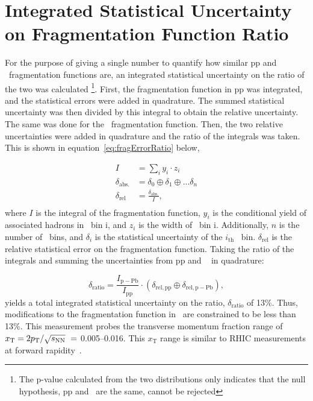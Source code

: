 \section{Integrated Statistical Uncertainty on Fragmentation Function Ratio}
For the purpose of giving a single number to quantify how similar pp and \pPb~fragmentation functions are, an integrated statistical uncertainty on the ratio of the two was calculated \footnote{The p-value calculated from the two distributions only indicates that the null hypothesis, pp and \pPb~are the same, cannot be rejected}. First, the fragmentation function in pp was integrated, and the statistical errors were added in quadrature. The summed statistical uncertainty was then divided by this integral to obtain the relative uncertainty. The same was done for the \pPb~fragmentation function. Then, the two relative uncertainties were added in quadrature and the ratio of the integrals was taken. This is shown in equation~\ref{eq:fragErrorRatio} below,

\begin{equation}\label{eq:fragErrorRatio}
  \begin{split}
    I &= \sum_i y_i\cdot z_i \\
    \delta_\mathrm{abs.} &= \delta_0 \oplus \delta_1 \oplus ...\delta_n\\
    \delta_\mathrm{rel} &= \frac{\delta_\mathrm{abs.}}{I},\\
  \end{split}
\end{equation}
where $I$ is the integral of the fragmentation function, $y_i$ is the conditional yield of associated hadrons in \zt~bin i, and $z_i$ is the width of \zt~bin i. Additionally, $n$ is the number of \zt~bins, and $\delta_i$ is the statistical uncertainty of the $i_\mathrm{th}$ \zt~bin. $\delta_\mathrm{rel}$ is the relative statistical error on the fragmentation function. Taking the ratio of the integrals and summing the uncertainties from pp and \pPb~ in quadrature:

\begin{equation}
  \delta_\mathrm{ratio} = \frac{I_\mathrm{p-Pb}}{I_\mathrm{pp}}\cdot (\delta_\mathrm{rel,pp} \oplus \delta_\mathrm{rel,p-Pb}),
\end{equation}
yields a total integrated statistical uncertainty on the ratio, $\delta_\mathrm{ratio}$ of 13\%. Thus, modifications to the fragmentation function in \pPb~are constrained to be less than 13\%. This measurement probes the transverse momentum fraction range of {$x_{\mathrm{T}} = 2\pt/\sqrt{s_{\mathrm{NN}}}\ = $ 0.005--0.016}. This $x_{\mathrm{T}}$ range is similar to RHIC measurements at forward rapidity~\cite{Adare:2011sc}.

